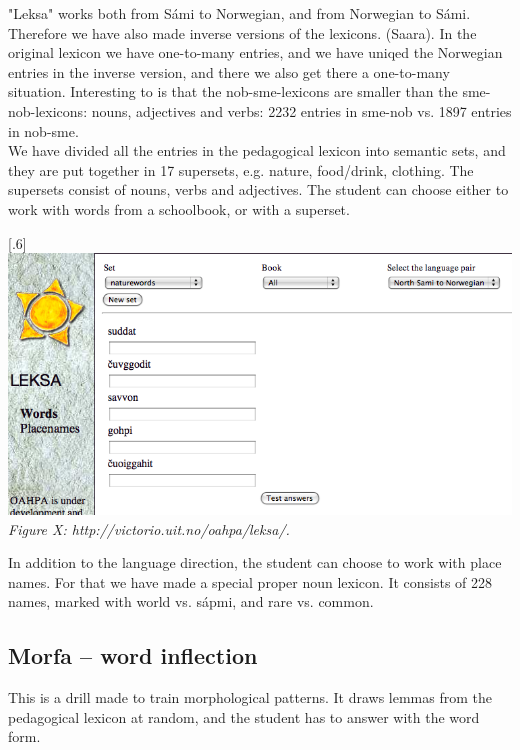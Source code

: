 \documentclass[a4paper,12pt]{article}
\begin{document}
"Leksa" works both from Sámi to Norwegian, and from Norwegian to Sámi. Therefore we have also made inverse versions of the lexicons. (Saara). In the original lexicon we have one-to-many entries, and we have uniqed the Norwegian entries in the inverse version, and there we also get there a one-to-many situation. Interesting to is that the nob-sme-lexicons are smaller than the sme-nob-lexicons: nouns, adjectives and verbs: 2232 entries in sme-nob vs. 1897 entries in nob-sme.\\ 

We have divided all the entries in the pedagogical lexicon into semantic sets, and they are put together in 17 supersets, e.g. nature, food/drink, clothing. The supersets consist of nouns, verbs and adjectives. The student can choose either to work with words from a schoolbook, or with a superset. 
\vspace{0.5cm}

\scalebox{.6}[.6]{\includegraphics{img/leksa.png}}\\
\textit{Figure X: http://victorio.uit.no/oahpa/leksa/.} 

\vspace{0.5cm}
In addition to the language direction, the student can choose to work with place names. For that we have made a special proper noun lexicon. It consists of 228 names, marked with world vs. sápmi, and rare vs. common. 


\subsection{Morfa -- word inflection}
This is a drill made to train morphological patterns. It draws lemmas from the pedagogical lexicon at random, and the student has to answer with the word form. 
\end{document}
